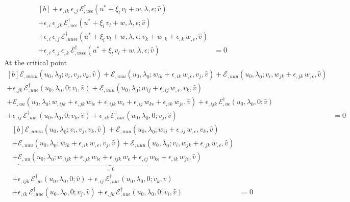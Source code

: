 \documentclass[12pt, final]{scrartcl}
\theoremstyle{definition}
\newcommand{\E}{\mathcal E}
\newcommand{\EE}{\mathcal E ^ \dagger}
\begin{document}
\begin{equation}
\begin{aligned}[b]
    + \epsilon_{,ik} \, \epsilon_{,j} \, \EE_{,u\epsilon\epsilon}(u^\ast + \xi_l \, v_l + w, \lambda, \epsilon; \hat{v}) &\\
    + \epsilon_{,i} \, \epsilon_{,jk} \, \EE_{,u\epsilon\epsilon}(u^\ast + \xi_l \, v_l + w, \lambda, \epsilon; \hat{v}) &\\
    + \epsilon_{,i} \, \epsilon_{,j} \, \EE_{,uu\epsilon\epsilon}(u^\ast + \xi_l \, v_l + w, \lambda, \epsilon;  v_k + w_{,k} + \epsilon_{,k} \, w_{,\epsilon}, \hat{v}) &\\
    + \epsilon_{,i} \, \epsilon_{,j} \, \epsilon_{,k} \, \EE_{,u\epsilon\epsilon\epsilon}(u^\ast + \xi_l \, v_l + w, \lambda, \epsilon; \hat{v}) &= 0
  \end{aligned}
\end{equation}
At the critical point
\begin{equation}
  \begin{aligned}[b]
    \E_{,uuuu}(u_0, \lambda_0; v_i, v_j, v_k, \hat{v}) + \E_{,uuu}(u_0, \lambda_0; w_{ik} + \epsilon_{,ik} \,  w_{,\epsilon}, v_j, \hat{v}) + \E_{,uuu}(u_0, \lambda_0; v_i, w_{jk} + \epsilon_{,jk} \,  w_{,\epsilon}, \hat{v})&\\
    + \epsilon_{,jk} \, \EE_{,uu\epsilon}(u_0, \lambda_0, 0; v_i, \hat{v}) + \E_{,uuu}(u_0, \lambda_0; w_{ij} + \epsilon_{,ij} \, w_{,\epsilon},  v_k, \hat{v})&\\
    + \E_{,uu}(u_0, \lambda_0; w_{,ijk} + \epsilon_{,jk} \, w_{i\epsilon} + \epsilon_{,ijk} \, w_{\epsilon}  + \epsilon_{,ij} \, w_{k\epsilon} + \epsilon_{,ik} \, w_{j\epsilon}, \hat{v}) + \epsilon_{,ijk} \, \EE_{,u\epsilon}(u_0, \lambda_0, 0; \hat{v})&\\
    + \epsilon_{,ij} \, \EE_{,uu\epsilon}(u_0, \lambda_0, 0; v_k, \hat{v}) + \epsilon_{,ik} \, \EE_{,uu\epsilon}(u_0, \lambda_0, 0; v_j, \hat{v}) &= 0
  \end{aligned}
\end{equation}
\begin{equation}
  \begin{aligned}[b]
    \E_{,uuuu}(u_0, \lambda_0; v_i, v_j, v_k, \hat{v}) + \E_{,uuu}(u_0, \lambda_0; w_{ij} + \epsilon_{,ij} \, w_{,\epsilon},  v_k, \hat{v})&\\
    + \E_{,uuu}(u_0, \lambda_0; w_{ik} + \epsilon_{,ik} \,  w_{,\epsilon}, v_j, \hat{v}) + \E_{,uuu}(u_0, \lambda_0; v_i, w_{jk} + \epsilon_{,jk} \,  w_{,\epsilon}, \hat{v})&\\
    + \underbrace{\E_{,uu}(u_0, \lambda_0; w_{,ijk} + \epsilon_{,jk} \, w_{i\epsilon} + \epsilon_{,ijk} \, w_{\epsilon}  + \epsilon_{,ij} \, w_{k\epsilon} + \epsilon_{,ik} \, w_{j\epsilon}, \hat{v})}_{=0} &\\
    + \epsilon_{,ijk} \, \EE_{,u\epsilon}(u_0, \lambda_0, 0; \hat{v}) + \epsilon_{,ij} \, \EE_{,uu\epsilon}(u_0, \lambda_0, 0; v_k, \hat{v}) &\\
    + \epsilon_{,ik} \, \EE_{,uu\epsilon}(u_0, \lambda_0, 0; v_j, \hat{v}) + \epsilon_{,jk} \, \EE_{,uu\epsilon}(u_0, \lambda_0, 0; v_i, \hat{v}) &= 0
  \end{aligned}
\end{equation}
\end{document}
